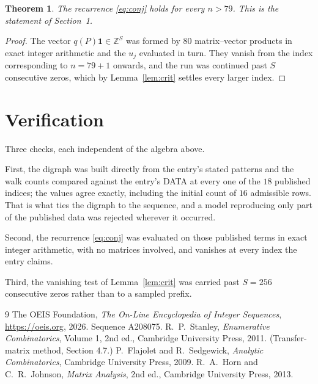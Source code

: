 \documentclass[11pt,a4paper]{article}
\theoremstyle{plain}
\newtheorem{theorem}{Theorem}
\theoremstyle{definition}
\begin{document}
\begin{theorem}
The recurrence \eqref{eq:conj} holds for every $n>79$. This is the statement of
Section~1.
\end{theorem}

\begin{proof}
The vector $q(P)\mathbf{1}\in\mathbb{Z}^{S}$ was formed by $80$ matrix--vector
products in exact integer arithmetic and the $u_j$ evaluated in turn. They vanish from the
index corresponding to $n=79+1$ onwards, and the run was continued past $S$ consecutive
zeros, which by Lemma~\ref{lem:crit} settles every larger index.
\end{proof}

\section{Verification}

Three checks, each independent of the algebra above.

First, the digraph was built directly from the entry's stated patterns and the walk counts
compared against the entry's DATA at every one of the $18$ published indices; the
values agree exactly, including the initial count of $16$ admissible rows. That is
what ties the digraph to the sequence, and a model reproducing only part of the published
data was rejected wherever it occurred.

Second, the recurrence \eqref{eq:conj} was evaluated on those published terms in exact
integer arithmetic, with no matrices involved, and vanishes at every index the entry claims.

Third, the vanishing test of Lemma~\ref{lem:crit} was carried past $S=256$ consecutive
zeros rather than to a sampled prefix.

\begin{thebibliography}{9}
 The OEIS Foundation, \emph{The On-Line Encyclopedia of Integer
Sequences}, \url{https://oeis.org}, 2026. Sequence A208075.
 R.~P.~Stanley, \emph{Enumerative Combinatorics}, Volume 1, 2nd ed.,
Cambridge University Press, 2011. (Transfer-matrix method, Section 4.7.)
 P.~Flajolet and R.~Sedgewick, \emph{Analytic Combinatorics}, Cambridge
University Press, 2009.
 R.~A.~Horn and C.~R.~Johnson, \emph{Matrix Analysis}, 2nd ed., Cambridge
University Press, 2013.
\end{thebibliography}
\end{document}
